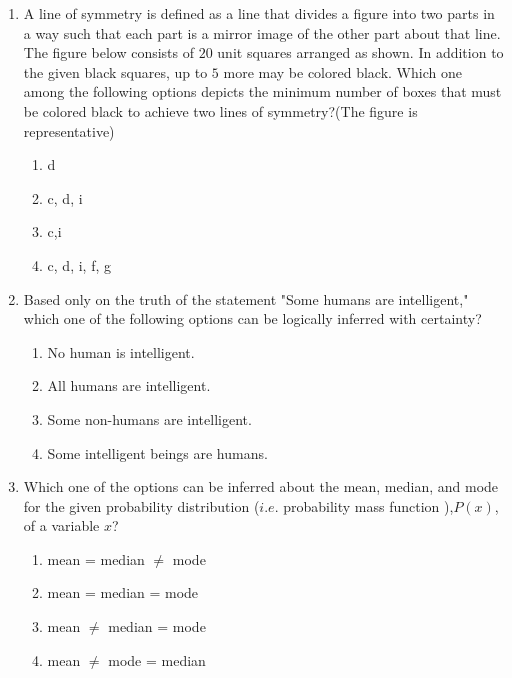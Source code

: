 \documentclass[journal,12pt,onecolumn]{IEEEtran}
\theoremstyle{remark}
\begin{document}
\begin{enumerate}
    \item A line of symmetry is defined as a line that divides a figure into two parts in a way such that each part is a mirror image of the other part about that line.\\
    The figure below consists of $20$ unit squares arranged as shown. In addition to the given black squares, up to $5$ more may be colored black. Which one among the following options depicts the minimum number of boxes that must be colored black to achieve two lines of symmetry?(The figure is representative)
\begin{figure}[H]
        \centering
    \end{figure}
    
    \begin{enumerate}
        \item d
        \item c, d, i
        \item c,i
        \item c, d, i, f, g
    \end{enumerate}

    \item Based only on the truth of the statement "Some humans are intelligent," which one of the following options can be logically inferred with certainty?
    \begin{enumerate}
        \item No human is intelligent.
        \item All humans are intelligent.
        \item Some non-humans are intelligent.
        \item Some intelligent beings are humans.
    \end{enumerate}

    \item Which one of the options can be inferred about the mean, median, and mode for the given probability distribution ($i.e.$ probability mass function ),$P(x)$, of a variable $x$?
      \begin{figure}[H]
        \centering
    \end{figure}
    \begin{enumerate}
        \item mean = median $\neq$ mode
        \item mean = median = mode
        \item mean $\neq$ median = mode
        \item mean $\neq$ mode = median
    \end{enumerate}


\end{enumerate}
\end{document}
